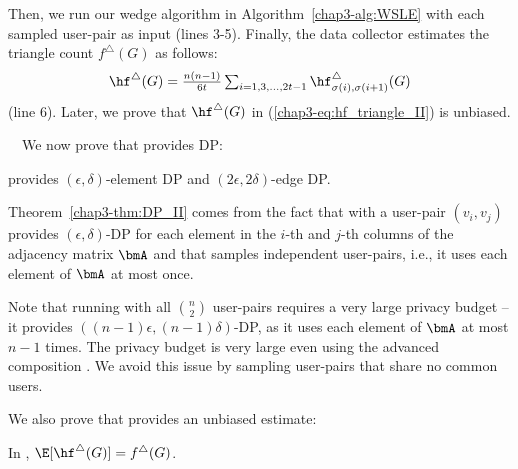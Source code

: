 Then, we run our wedge algorithm \AlgWSLE{} in Algorithm~\ref{chap3-alg:WSLE} with each sampled user-pair as input (lines 3-5). 
Finally, the data collector estimates the triangle count $f^\triangle(G)$ as follows: 
\begin{align}
    \hf^\triangle(G) = \textstyle{\frac{n(n-1)}{6t} \sum_{i=1, 3, \ldots, 2t-1} \hf_{\sigma(i),\sigma(i+1)}^\triangle(G)} 
   \label{chap3-eq:hf_triangle_II}
\end{align}
(line 6). Later, we prove that $\hf^\triangle(G)$ in (\ref{chap3-eq:hf_triangle_II}) is unbiased. 

\smallskip
{}~~We now prove that 
\AlgWSTri{} provides DP: 
\begin{theorem}
\label{chap3-thm:DP_II}
\AlgWSTri{} provides $(\epsilon, \delta)$-element DP and $(2\epsilon, 2\delta)$-edge DP. 
\end{theorem}
Theorem~\ref{chap3-thm:DP_II} comes from the fact that 
\AlgWSLE{} with a user-pair $(v_i,v_j)$ provides $(\epsilon,\delta)$-DP for each element in the $i$-th and $j$-th columns of the adjacency matrix $\bmA$ and that \AlgWSTri{} samples independent user-pairs, i.e., it uses each element of $\bmA$ at most once. 

Note that running \AlgWSLE{} with all $\binom{n}{2}$ user-pairs requires a very large privacy budget --  
it provides $((n-1) \epsilon, (n-1) \delta)$-DP, as it uses each element of $\bmA$ at most $n-1$ times. 
The privacy budget is very large even using the advanced composition \cite{DP,Kairouz_ICML15}. 
We avoid this issue by sampling user-pairs that share no common users. 

We also prove that 
\AlgWSTri{} provides an unbiased estimate: 
\begin{theorem}
\label{chap3-thm:unbiased_II}
In \AlgWSTri{}, $\E[\hf^\triangle(G)] = f^\triangle(G)$. 
\end{theorem}


